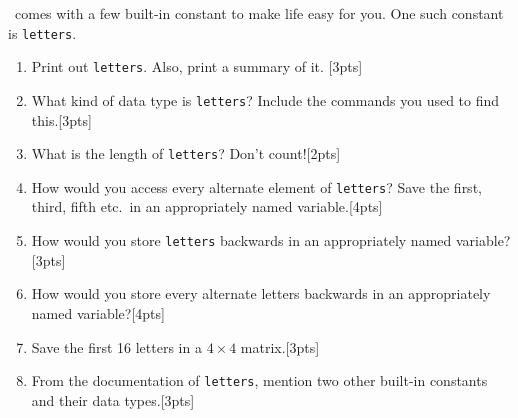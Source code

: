 \documentclass[10pt]{article}
\begin{document}
  \R\ comes with a few built-in constant to make life easy for you. One such constant is {\tt letters}.
\begin{enumerate}
  \item Print out {\tt letters}. Also, print a summary of it. \hfill [3pts]
  \item What kind of data type is {\tt letters}? Include the commands you used to find this.\hfill [3pts]
  \item What is the length of {\tt letters}? Don't count!\hfill [2pts]
  \item How would you access every alternate element of {\tt letters}? Save the first, third, fifth etc.\ in an appropriately
    named variable.\hfill [4pts]
  \item How would you store {\tt letters} backwards in an appropriately named variable?\hfill [3pts]
  \item How would you store every alternate letters backwards in an appropriately named variable?\hfill [4pts]
\item Save the first 16 letters in a $4\times 4$ matrix.\hfill [3pts]
\item From the documentation of {\tt letters}, mention two other built-in constants and their data types.\hfill [3pts]
\end{enumerate}
\end{document}
